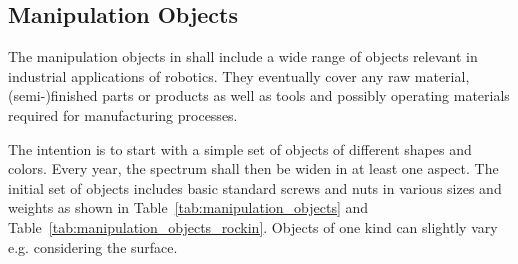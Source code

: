 \subsection{Manipulation Objects} \label{ssec:ManipulationObjects}
The manipulation objects in \RCAW shall include a wide range of objects relevant in industrial applications of robotics. They eventually cover any raw material, (semi-)finished parts or products as well as tools and possibly operating materials required for manufacturing processes.
\par
The intention is to start with a simple set of objects of different shapes and colors. Every year, the spectrum shall then be widen in at least one aspect. The initial set of objects includes basic standard screws and nuts in various sizes and weights as shown in Table~\ref{tab:manipulation_objects} and Table~\ref{tab:manipulation_objects_rockin}. Objects of one kind can slightly vary e.g. considering the surface. 

